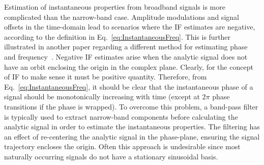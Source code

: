 \documentclass[a4paper]{IEEEtran}
\begin{document}
Estimation of instantaneous properties from broadband signals is more complicated than the narrow-band case. Amplitude modulations and signal offsets in the time-domain lead to scenarios where the IF estimates are negative, according to the definition in Eq.~\ref{eq:InstantaneousFreq}. This is further illustrated in another paper regarding a different method for estimating phase and frequency~\cite{Huang1998}. Negative IF estimates arise when the analytic signal does not have an orbit enclosing the origin in the complex plane. Clearly, for the concept of IF to make sense it must be positive quantity. Therefore, from Eq.~\ref{eq:InstantaneousFreq}, it should be clear that the instantaneous phase of a signal should be monotonically increasing with time (except at $2\pi$ phase transitions if the phase is wrapped). To overcome this problem, a band-pass filter is typically used to extract narrow-band components before calculating the analytic signal in order to estimate the instantaneous properties. The filtering has an effect of re-centering the analytic signal in the phase-plane, ensuring the signal trajectory encloses the origin. Often this approach is undesirable since most naturally occurring signals do not have a stationary sinusoidal basis. 

\end{document}

